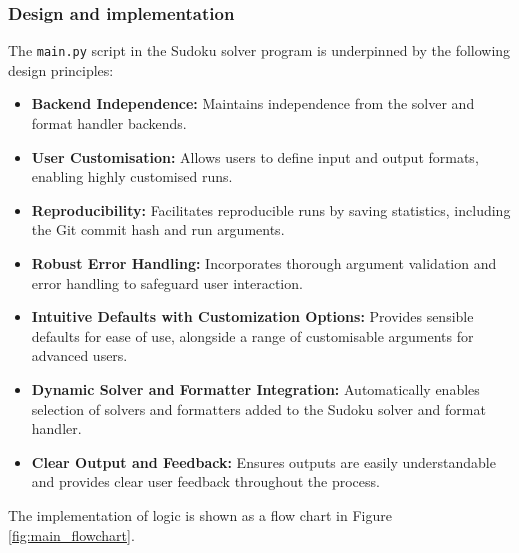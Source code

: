 \documentclass[11pt]{article}
\begin{document}
\subsubsection{Design and implementation}
The \texttt{main.py} script in the Sudoku solver program is underpinned by the following design principles:

\begin{itemize}
    \item \textbf{Backend Independence:} Maintains independence from the solver and format handler backends.
    \item \textbf{User Customisation:} Allows users to define input and output formats, enabling highly customised runs.
    \item \textbf{Reproducibility:} Facilitates reproducible runs by saving statistics, including the Git commit hash and run arguments.
    \item \textbf{Robust Error Handling:} Incorporates thorough argument validation and error handling to safeguard user interaction.
    \item \textbf{Intuitive Defaults with Customization Options:} Provides sensible defaults for ease of use, alongside a range of customisable arguments for advanced users.
    \item \textbf{Dynamic Solver and Formatter Integration:} Automatically enables selection of solvers and formatters added to the Sudoku solver and format handler.
    \item \textbf{Clear Output and Feedback:} Ensures outputs are easily understandable and provides clear user feedback throughout the process.
\end{itemize}

The implementation of logic is shown as a flow chart in Figure \ref{fig:main_flowchart}.
\end{document}
